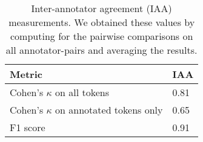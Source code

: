 \documentclass[../report.tex]{subfiles}
\begin{document}
\begin{table}[t]
\begin{tabular}{@{}p{6cm}p{1.25cm}@{}}
\toprule
Metric &  IAA  \\ \midrule
Cohen's $\kappa$ on all tokens & 0.81 \\ 
Cohen's $\kappa$ on annotated tokens only & 0.65 \\
F1 score & 0.91 \\ \bottomrule
\end{tabular}
\caption{
    Inter-annotator agreement (IAA) measurements.
    We obtained these values by computing for the pairwise comparisons on all annotator-pairs and averaging the results.
}
\label{table:iaa}
\end{table}
\end{document}
